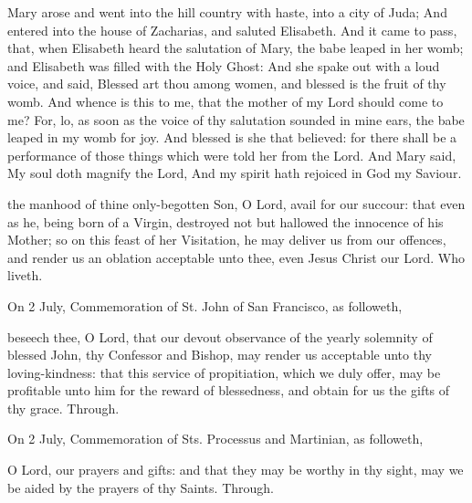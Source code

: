 
 Mary arose and went into the hill country with haste, into a city of Juda; And entered into the house of Zacharias, and saluted Elisabeth. And it came to pass, that, when Elisabeth heard the salutation of Mary, the babe leaped in her womb; and Elisabeth was filled with the Holy Ghost: And she spake out with a loud voice, and said, Blessed art thou among women, and blessed is the fruit of thy womb. And whence is this to me, that the mother of my Lord should come to me? For, lo, as soon as the voice of thy salutation sounded in mine ears, the babe leaped in my womb for joy. And blessed is she that believed: for there shall be a performance of those things which were told her from the Lord. And Mary said, My soul doth magnify the Lord, And my spirit hath rejoiced in God my Saviour.


\clearpage
{}

\secret
{} the manhood of thine only-begotten Son, O Lord, avail for our succour: that even as he, being born of a Virgin, destroyed not but hallowed the innocence of his Mother; so on this feast of her Visitation, he may deliver us from our offences, and render us an oblation acceptable unto thee, even Jesus Christ our Lord. Who liveth.

\begin{rubric}
	 On 2 July, Commemoration of St. John of San Francisco, as followeth,
\end{rubric}
 beseech thee, O Lord, that our devout observance of the yearly solemnity of blessed John, thy Confessor and Bishop, may render us acceptable unto thy loving-kindness: that this service of propitiation, which we duly offer, may be profitable unto him for the reward of blessedness, and obtain for us the gifts of thy grace. Through.

\begin{rubric}
	 On 2 July, Commemoration of Sts. Processus and Martinian, as followeth,
\end{rubric}
 O Lord, our prayers and gifts: and that they may be worthy in thy sight, may we be aided by the prayers of thy Saints. Through.

